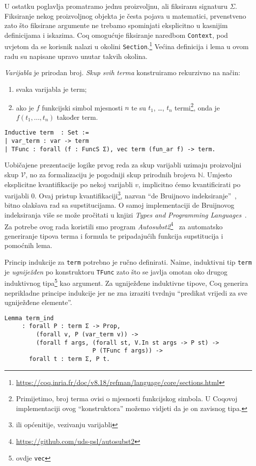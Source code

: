 \noindent U ostatku poglavlja promatramo jednu proizvoljnu, ali fiksiranu signaturu \(\Sigma\).
Fiksiranje nekog proizvoljnog objekta je česta pojava u matematici,
prvenstveno zato što fiksirane argumente ne trebamo spominjati eksplicitno u kasnijim definicijama i iskazima.
Coq omogućuje fiksiranje naredbom \texttt{Context},
pod uvjetom da se korisnik nalazi u okolini \texttt{Section}.\footnote{\url{https://coq.inria.fr/doc/v8.18/refman/language/core/sections.html}}
Većina definicija i lema u ovom radu su napisane upravo unutar takvih okolina.

\begin{definition}\label{def:term}
  \textit{Varijabla} je prirodan broj. \textit{Skup svih terma} konstruiramo rekurzivno na način:
  \begin{enumerate}
  \item svaka varijabla je term;
  \item ako je \(f\) funkcijski simbol mjesnosti \(n\) te su \(t_{1}\), \ldots, \(t_{n}\) termi\footnote{Primijetimo, broj terma ovisi o mjesnosti funkcijskog simbola. U Coqovoj implementaciji ovog \enquote{konstruktora} možemo vidjeti da je on zavisnog tipa.},
    onda je \(f(t_{1}, \ldots, t_{n})\) također term.
  \end{enumerate}
\begin{verbatim}
Inductive term  : Set :=
| var_term : var -> term 
| TFunc : forall (f : FuncS Σ), vec term (fun_ar f) -> term.
\end{verbatim}
\end{definition}
\noindent Uobičajene prezentacije logike prvog reda za
skup varijabli uzimaju proizvoljni skup \(\mathcal{V}\),
no za formalizaciju je pogodniji skup prirodnih brojeva \(\mathbb{N}\).
Umjesto eksplicitne kvantifikacije po nekoj varijabli \(v\),
implicitno ćemo kvantificirati po varijabli \(0\).
Ovaj pristup kvantifikaciji\footnote{ili općenitije, vezivanju varijabli},
nazvan \enquote{de Bruijnovo indeksiranje}~\cite{debruijnamelessdummies},
bitno olakšava rad sa supstitucijama.
O samoj implementaciji de Bruijnovog indeksiranja više se može pročitati u knjizi
\textit{Types and Programming Languages}~\cite{pierce2002tapl}.
Za potrebe ovog rada koristili smo program \textit{Autosubst2}\footnote{\url{https://github.com/uds-psl/autosubst2}}~\cite{stark-phd,autosubst2}
za automatsko generiranje tipova terma i formula te pripadajućih funkcija supstitucija i pomoćnih lema.

Princip indukcije za \texttt{term} potrebno je ručno definirati.
Naime, induktivni tip \texttt{term} je \textit{ugniježđen} po konstruktoru \texttt{TFunc} zato što
se javlja omotan oko drugog induktivnog tipa\footnote{ovdje \texttt{vec}} kao argument.
Za ugniježđene induktivne tipove, Coq generira neprikladne principe indukcije jer ne zna
izraziti tvrdnju \enquote{predikat vrijedi za sve ugniježđene elemente}.
\begin{verbatim}
Lemma term_ind
     : forall P : term Σ -> Prop,
         (forall v, P (var_term v)) ->
         (forall f args, (forall st, V.In st args -> P st) ->
                         P (TFunc f args)) ->
       forall t : term Σ, P t.
\end{verbatim}

